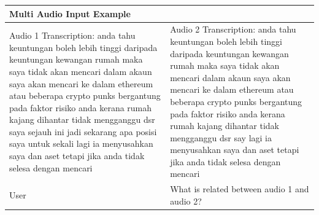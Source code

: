 \documentclass[preprint]{article}
\begin{document}
\begin{table}[hbt]
  \setlength{\extrarowheight}{3pt}
  \renewcommand{\arraystretch}{1.5}
  \begin{tabular}{p{6.5cm} p{6.5cm}}
    \hline
    \textbf{Multi Audio Input Example}                                                                                                                                                                                                                                                                                                                                                                                                                                                                                                                                                                                                                                                                                                                                                                                           \\[3pt]
    \hline
    \hline
    Audio 1 Transcription: anda tahu keuntungan boleh lebih tinggi daripada keuntungan kewangan rumah maka saya tidak akan mencari dalam akaun saya akan mencari ke dalam ethereum atau beberapa crypto punks bergantung pada faktor risiko anda kerana rumah kajang dihantar tidak mengganggu dsr saya sejauh ini jadi sekarang apa posisi saya untuk sekali lagi ia menyusahkan saya dan aset tetapi jika anda tidak selesa dengan mencari & Audio 2 Transcription: anda tahu keuntungan boleh lebih tinggi daripada keuntungan kewangan rumah maka saya tidak akan mencari dalam akaun saya akan mencari ke dalam ethereum atau beberapa crypto punks bergantung pada faktor risiko anda kerana rumah kajang dihantar tidak mengganggu dsr say lagi ia menyusahkan saya dan aset tetapi jika anda tidak selesa dengan mencari \\
    \hline
    User                                                                                                                                                                                                                                                                                                                                                                                                                                     & What is related between audio 1 and audio 2?                                                                                                                                                                                                                                                                                                                                      \\

\end{tabular}
\end{table}
\end{document}
